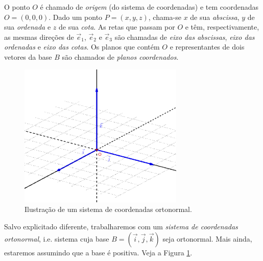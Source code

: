 O ponto $O$ é chamado de \emph{origem} (do sistema de coordenadas) e tem coordenadas $O=(0,0,0)$. Dado um ponto $P=(x,y,z)$, chama-se $x$ de sua \emph{abscissa}, $y$ de sua \emph{ordenada} e $z$ de sua \emph{cota}. As retas que passam por $O$ e têm, respectivamente, as mesmas direções de $\vec{e}_1$, $\vec{e}_2$ e $\vec{e}_3$ são chamadas de \emph{eixo das abscissas}, \emph{eixo das ordenadas} e \emph{eixo das cotas}. Os planos que contém $O$ e representantes de dois vetores da base $B$ são chamados de \emph{planos coordenados}.

\begin{figure}[H]
  \centering
  \includegraphics[width=0.7\textwidth]{./cap_scoord/dados/fig_sis_coord_orto/fig}
  \caption{Ilustração de um sistema de coordenadas ortonormal.}
  \label{fig:sis_coord_orto}
\end{figure}

Salvo explicitado diferente, trabalharemos com um \emph{sistema de coordenadas ortonormal}, i.e. sistema cuja base $B = (\vec{i},\vec{j},\vec{k})$ seja ortonormal. Mais ainda, estaremos assumindo que a base é positiva. Veja a Figura \ref{fig:sis_coord_orto}.

